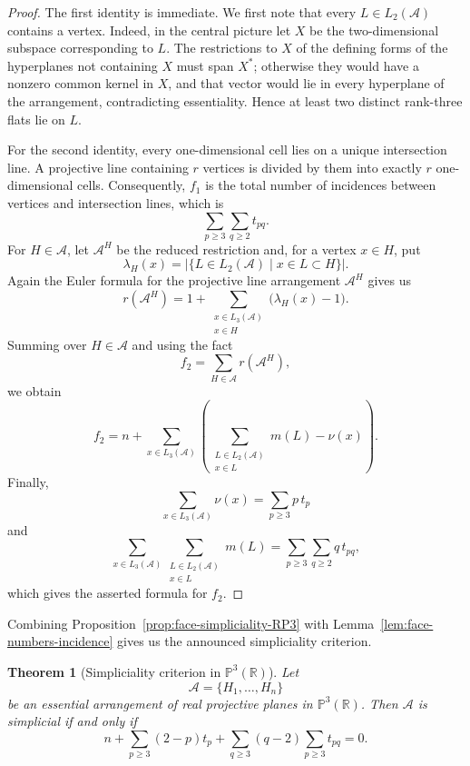 \documentclass[11pt]{article}
\newtheorem{theorem}{Theorem}[section]
\theoremstyle{definition}
\theoremstyle{remark}
\newcommand{\PP}{\mathbb P}
\newcommand{\RR}{\mathbb R}
\newcommand{\cA}{\mathcal A}
\begin{document}
\begin{proof}
The first identity is immediate. We first note that every
$L\in L_2(\cA)$ contains a vertex. Indeed, in the central picture let
$X$ be the two-dimensional subspace corresponding to $L$. The
restrictions to $X$ of the defining forms of the hyperplanes not
containing $X$ must span $X^*$; otherwise they would have a nonzero
common kernel in $X$, and that vector would lie in every hyperplane of
the arrangement, contradicting essentiality. Hence at least two
distinct rank-three flats lie on $L$.

For the second identity, every one-dimensional cell lies on a unique
intersection line. A projective line containing $r$ vertices is divided
by them into exactly $r$ one-dimensional cells.
Consequently, $f_1$ is the total number of incidences between vertices
and intersection lines, which is
\[
\sum_{p\geq 3}\sum_{q\geq 2}t_{pq}.
\]
For $H\in\cA$, let $\cA^H$ be the reduced restriction and, for a vertex
$x\in H$, put
\[
\lambda_H(x)
=
\bigl|\{L\in L_2(\cA)\mid x\in L\subset H\}\bigr|.
\]
Again the Euler formula for the projective line arrangement $\cA^H$ gives us
\[
r(\cA^H)
=
1+
\sum_{\substack{x\in L_3(\cA)\\x\in H}}
\bigl(\lambda_H(x)-1\bigr).
\]
Summing over $H\in\cA$ and using the fact
\[
f_2=\sum_{H\in\cA}r(\cA^H),
\]
we obtain
\[
f_2
=
n+
\sum_{x\in L_3(\cA)}
\left(
\sum_{\substack{L\in L_2(\cA)\\x\in L}}m(L)-\nu(x)
\right).
\]
Finally,
\[
\sum_{x\in L_3(\cA)}\nu(x)
=
\sum_{p\geq 3}p\,t_p
\]
and
\[
\sum_{x\in L_3(\cA)}
\sum_{\substack{L\in L_2(\cA)\\x\in L}}m(L)
=
\sum_{p\geq 3}\sum_{q\geq 2}q\,t_{pq},
\]
which gives the asserted formula for $f_2$.
\end{proof}

Combining Proposition~\ref{prop:face-simpliciality-RP3} with
Lemma~\ref{lem:face-numbers-incidence} gives us the announced simpliciality criterion.

\begin{theorem}[Simpliciality criterion in $\PP^3(\RR)$]
\label{thm:simpliciality-RP3}
Let
\[
\cA=\{H_1,\ldots,H_n\}
\]
be an essential arrangement of real projective planes in
$\PP^3(\RR)$. Then $\cA$ is simplicial if and only if
\begin{equation}
\label{eq:simpliciality-GS-data}
n
+
\sum_{p\geq 3}(2-p)t_p
+
\sum_{q\geq 3}(q-2)
\sum_{p\geq 3}t_{pq}
=0.
\end{equation}
\end{theorem}
\end{document}
